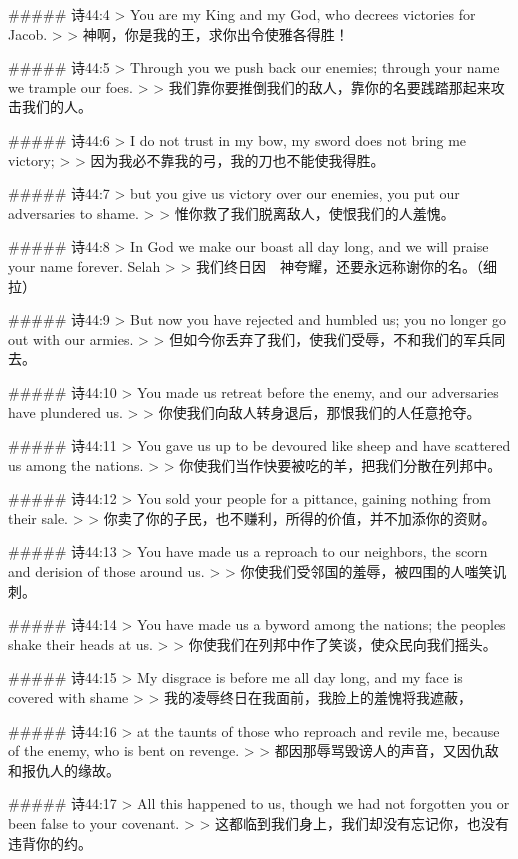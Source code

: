 ##### 诗44:4
> You are my King and my God, who decrees victories for Jacob.
>
> 神啊，你是我的王，求你出令使雅各得胜！


##### 诗44:5
> Through you we push back our enemies; through your name we trample our foes.
>
> 我们靠你要推倒我们的敌人，靠你的名要践踏那起来攻击我们的人。


##### 诗44:6
> I do not trust in my bow, my sword does not bring me victory;
>
> 因为我必不靠我的弓，我的刀也不能使我得胜。


##### 诗44:7
> but you give us victory over our enemies, you put our adversaries to shame.
>
> 惟你救了我们脱离敌人，使恨我们的人羞愧。


##### 诗44:8
> In God we make our boast all day long, and we will praise your name forever. Selah
>
> 我们终日因　神夸耀，还要永远称谢你的名。（细拉）


##### 诗44:9
> But now you have rejected and humbled us; you no longer go out with our armies.
>
> 但如今你丢弃了我们，使我们受辱，不和我们的军兵同去。


##### 诗44:10
> You made us retreat before the enemy, and our adversaries have plundered us.
>
> 你使我们向敌人转身退后，那恨我们的人任意抢夺。


##### 诗44:11
> You gave us up to be devoured like sheep and have scattered us among the nations.
>
> 你使我们当作快要被吃的羊，把我们分散在列邦中。


##### 诗44:12
> You sold your people for a pittance, gaining nothing from their sale.
>
> 你卖了你的子民，也不赚利，所得的价值，并不加添你的资财。


##### 诗44:13
> You have made us a reproach to our neighbors, the scorn and derision of those around us.
>
> 你使我们受邻国的羞辱，被四围的人嗤笑讥刺。


##### 诗44:14
> You have made us a byword among the nations; the peoples shake their heads at us.
>
> 你使我们在列邦中作了笑谈，使众民向我们摇头。


##### 诗44:15
> My disgrace is before me all day long, and my face is covered with shame
>
> 我的凌辱终日在我面前，我脸上的羞愧将我遮蔽，


##### 诗44:16
> at the taunts of those who reproach and revile me, because of the enemy, who is bent on revenge.
>
> 都因那辱骂毁谤人的声音，又因仇敌和报仇人的缘故。


##### 诗44:17
> All this happened to us, though we had not forgotten you or been false to your covenant.
>
> 这都临到我们身上，我们却没有忘记你，也没有违背你的约。


